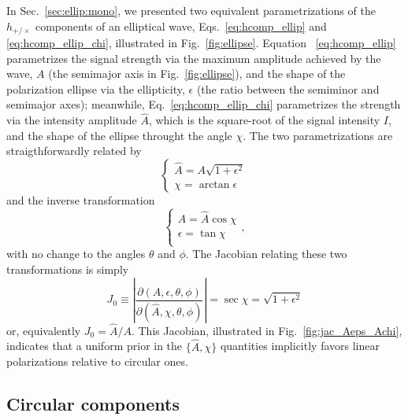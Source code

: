 \documentclass[aps,prd,twocolumn,superscriptaddress,preprintnumbers,floatfix,nofootinbib]{revtex4-2}
\begin{document}
In Sec.~\ref{sec:ellip:mono}, we presented two equivalent parametrizations of the $h_{+/\times}$ components of an elliptical wave, Eqs.~\eqref{eq:hcomp_ellip} and \eqref{eq:hcomp_ellip_chi}, illustrated in Fig.~\ref{fig:ellipse}.
Equation ~\eqref{eq:hcomp_ellip} parametrizes the signal strength via the maximum amplitude achieved by the wave, $A$ (the semimajor axis in Fig.~\ref{fig:ellipse}), and the shape of the polarization ellipse via the ellipticity, $\epsilon$ (the ratio between the semiminor and semimajor axes);
meanwhile, Eq.~\eqref{eq:hcomp_ellip_chi} parametrizes the strength via the intensity amplitude $\hat{A}$, which is the square-root of the signal intensity $I$, and the shape of the ellipse throught the angle $\chi$.
The two parametrizations are straigthforwardly related by
\begin{equation} \label{eq:Aellip_Ahatchi}
\begin{cases}
\hat{A} = A \sqrt{1 + \epsilon^2} \\
\chi = \arctan \epsilon 
\end{cases} 
\end{equation}
and the inverse transformation
\begin{equation} \label{eq:Ahatchi_Aellip}
\begin{cases}
A = \hat{A} \cos \chi \\
\epsilon = \tan \chi \\
\end{cases} ,
\end{equation}
with no change to the angles $\theta$ and $\phi$.
The Jacobian relating these two transformations is simply
\begin{equation} \label{eq:jac_Aeps_Achi}
J_0 \equiv \left| \frac{\partial(A,\epsilon,\theta,\phi)}{\partial(\hat{A}, \chi, \theta, \phi)}\right| =  \sec \chi = \sqrt{1 + \epsilon^2}
\end{equation}
or, equivalently $J_0 = \hat{A}/A$.
This Jacobian, illustrated in Fig.~\ref{fig:jac_Aeps_Achi}, indicates that a uniform prior in the $\{\hat{A}, \chi\}$ quantities implicitly favors linear polarizations relative to circular ones.

\subsection{Circular components}
\label{sec:jac:Arl}
\end{document}
